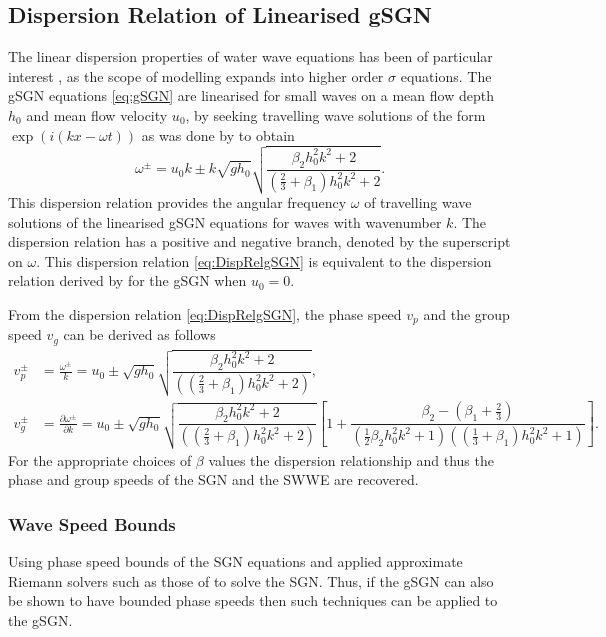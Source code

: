 \documentclass[10pt]{elsarticle}
\begin{document}
\subsection{Dispersion Relation of Linearised gSGN}
The linear dispersion properties of water wave equations has been of particular interest \cite{Filippini-etal-2016-381,Clamond-et.al-2017-245,DoCarmo-2019-125}, as the scope of modelling expands into higher order $\sigma$ equations. The gSGN equations \eqref{eq:gSGN} are linearised for small waves on a mean flow depth $h_0$ and mean flow velocity $u_0$, by seeking travelling wave solutions of the form $\exp\left(i (k x - \omega t)\right)$ as was done by \citet{Zoppou-etal-2017} to obtain
\begin{equation}
\omega^\pm = u_0 k \pm k \sqrt{gh_0} \sqrt{\dfrac{\beta_2 h_0^2 k^2 + 2}{\left(\frac{2}{3} + \beta_1\right) h_0^2 k^2 + 2} }.
\label{eq:DispRelgSGN}
\end{equation}
This dispersion relation provides the angular frequency $\omega$ of travelling wave solutions of the linearised gSGN equations for waves with wavenumber $k$. The dispersion relation has a positive and negative branch, denoted by the superscript on $\omega$. This dispersion relation \eqref{eq:DispRelgSGN} is equivalent to the dispersion relation derived by \citet{Clamond-Dutykh-2018-237} for the gSGN when $u_0 = 0$. 

From the dispersion relation \eqref{eq:DispRelgSGN}, the phase speed $v_p$ and the group speed $v_g$ can be derived as follows
\begin{subequations}
\begin{align}
v^\pm_p &= \frac{\omega^\pm}{k} = u_0 \pm  \sqrt{gh_0} \sqrt{\dfrac{\beta_2 h_0^2 k^2 + 2}{\left( \left(\frac{2}{3} + \beta_1\right) h_0^2 k^2 + 2\right)} },\\
v^\pm_g &= \frac{\partial \omega^\pm }{\partial k}= u_0  \pm  \sqrt{gh_0} \sqrt{\dfrac{\beta_2 h_0^2 k^2 + 2}{\left( \left(\frac{2}{3} + \beta_1\right) h_0^2 k^2 + 2\right)} } \left[1 +  \dfrac{\beta_2 - \left(\beta_1 + \frac{2}{3}\right)}{\left(\frac{1}{2}\beta_2 h_0^2 k^2 +1\right)\left( \left(\frac{1}{3} + \beta_1\right) h_0^2 k^2 + 1\right)}\right].
\end{align}
\label{eq:wavespeeds}
\end{subequations}
For the appropriate choices of $\beta$ values the dispersion relationship and thus the phase and group speeds of the SGN \cite{Zoppou-etal-2017} and the SWWE are recovered.

\subsubsection{Wave Speed Bounds}
Using phase speed bounds of the SGN equations \citet{Hank-etal-2010-2034} and \citet{Zoppou-etal-2017} applied approximate Riemann solvers such as those of \citet{Kurganov-etal-2001-707} to solve the SGN. Thus, if the gSGN can also be shown to have bounded phase speeds then such techniques can be applied to the gSGN. 
\end{document}

